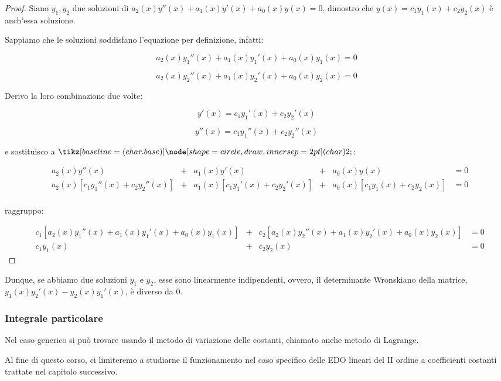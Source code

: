 \begin{proof}
    Siano \(y_1, y_2\) due soluzioni di \(a_2(x)y''(x) + a_1(x) y'(x) + a_0(x) y(x) = 0\), dimostro che \(y(x) = c_1 y_1(x) + c_2 y_2(x)\) è anch'essa soluzione.

    Sappiamo che le soluzioni soddisfano l'equazione per definizione, infatti:

    \[
        a_2(x)y_1''(x) + a_1(x) y_1'(x) + a_0(x) y_1(x) = 0
    \]

    \[
        a_2(x)y_2''(x) + a_1(x) y_2'(x) + a_0(x) y_2(x) = 0
    \]

    Derivo la loro combinazione due volte:

    \[
        y'(x) = c_1 y_1'(x) + c_2 y_2'(x)
    \]

    \[
        y''(x) = c_1 y_1''(x) + c_2 y_2''(x)
    \]

    e sostituisco a \(\circled{2}\):

    \begin{align*}
         & a_2(x)y''(x)                           & + & a_1(x) y'(x)                        & + & a_0(x) y(x)                       & = 0 \\
         & a_2(x) [ c_1y_1''(x) + c_2 y_2 ''(x) ] & + & a_1(x)[ c_1 y_1'(x) + c_2 y_2'(x) ] & + & a_0(x) [ c_1 y_1(x) + c_2 y_2(x)] & = 0 \\
    \end{align*}

    raggruppo:

    \begin{align*}
         & c_1[a_2(x) y_1''(x) + a_1(x) y_1'(x) + a_0(x) y_1(x)] & + & c_2 [a_2(x) y_2''(x) + a_1(x) y_2'(x) + a_0(x) y_2(x)] & = 0 \\
         & c_1 y_1(x)                                            & + & c_2 y_2(x)                                             & = 0
    \end{align*}
\end{proof}

Dunque, se abbiamo due soluzioni \(y_1\) e \(y_2\), esse sono linearmente indipendenti, ovvero, il determinante Wronskiano della matrice, \(y_1(x)y_2'(x)-y_2(x)y_1'(x)\), è diverso da 0.

\subsubsection{Integrale particolare}

Nel caso generico si può trovare usando il metodo di variazione delle costanti, chiamato anche metodo di Lagrange.

Al fine di questo corso, ci limiteremo a studiarne il funzionamento nel caso specifico delle EDO lineari del II ordine a coefficienti costanti trattate nel capitolo successivo.
